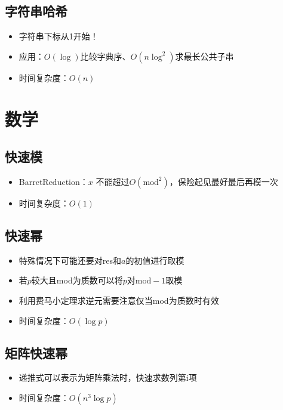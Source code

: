 \documentclass[twocolumn,a4,8pt]{article}  %
\begin{document}
		\subsection{字符串哈希}
	 		\noindent\begin{itemize}
		 		\item 字符串下标从1开始！
		 		\item 应用：$O(\log)$比较字典序、$O(n\log^2)$求最长公共子串
		 		\item 时间复杂度：$O(n)$
	 		\end{itemize}
			
	 	 	
	\section{数学}
		\subsection{快速模}
	 		\noindent\begin{itemize}
		 		\item BarretReduction：$x$ 不能超过$O(\text{mod}^2)$，保险起见最好最后再模一次
		 		\item 时间复杂度：$O(1)$
	 		\end{itemize}
	 	 	
	 	 	
		\subsection{快速幂}
	 		\noindent\begin{itemize}
		 		\item 特殊情况下可能还要对res和$a$的初值进行取模
		 		\item 若$p$较大且mod为质数可以将$p$对$\text{mod}-1$取模
		 		\item 利用费马小定理求逆元需要注意仅当mod为质数时有效
		 		\item 时间复杂度：$O(\log p)$
	 		\end{itemize}
	 	 	
	 	 	
		\subsection{矩阵快速幂}
	 		\noindent\begin{itemize}
		 		\item 递推式可以表示为矩阵乘法时，快速求数列第i项
		 		\item 时间复杂度：$O(n^3\log p)$
	 		\end{itemize}
	 	 	
	 	 	
\end{document}
